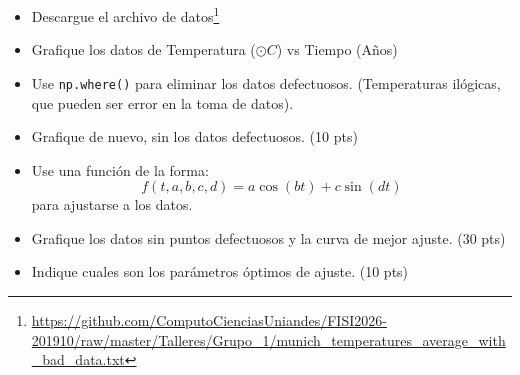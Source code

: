 \documentclass{article}
\begin{document}
\begin{itemize}
  \item Descargue el archivo de datos\footnote{\url{https://github.com/ComputoCienciasUniandes/FISI2026-201910/raw/master/Talleres/Grupo_1/munich_temperatures_average_with_bad_data.txt}}
  \item Grafique los datos de Temperatura ($\odot C$) vs Tiempo (Años)
  \item Use \texttt{np.where()} para eliminar los datos defectuosos. (Temperaturas ilógicas, que pueden ser error en la toma de datos).
  \item Grafique de nuevo, sin los datos defectuosos. (10 pts)
  \item Use una función de la forma:
    \[ f(t, a, b, c, d) = a \cos ( b t ) + c \sin( d t) \]
    para ajustarse a los datos.
  \item Grafique los datos sin puntos defectuosos y la curva de mejor ajuste. (30 pts)
  \item Indique cuales son los parámetros óptimos de ajuste. (10 pts)
\end{itemize}
\end{document}
